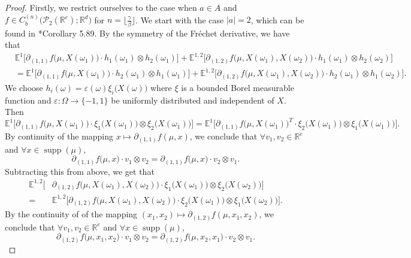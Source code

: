 \documentclass[a4paper,11pt,twoside]{article}
\numberwithin{equation}{section}
\theoremstyle{plain}
\newcommand{\bE}{\mathbb{E}}
\newcommand{\bR}{\mathbb{R}}
\newcommand{\cP}{\mathcal{P}}
\DeclareMathOperator{\supp}{supp}
\newcommand{\1}{\mathbbm{1}}
\begin{document}
	\begin{proof}
		Firstly, we restrict ourselves to the case when $a\in A$ and $f\in C_b^{(n)}\big( \cP_2(\bR^e); \bR^d\big)$ for $n = \big\lfloor\tfrac{\gamma}{\beta} \big\rfloor$. We start with the case $|a|=2$, which can be found in \cite{CarmonaDelarue2017book1}*{Corollary 5.89}. By the symmetry of the Fr\'echet derivative, we have that
		\begin{align*}
			&\bE^1\Big[ \partial_{(1,1)} f\Big( \mu, X(\omega_1) \Big) \cdot h_1(\omega_1) \otimes h_2(\omega_1) \Big] + \bE^{1,2}\Big[ \partial_{(1,2)} f\Big( \mu, X(\omega_1), X(\omega_2) \Big) \cdot h_1(\omega_1) \otimes h_2(\omega_2) \Big]
			\\
			&= \bE^1\Big[ \partial_{(1,1)} f\Big( \mu, X(\omega_1) \Big) \cdot h_2(\omega_1) \otimes h_1(\omega_1) \Big] + \bE^{1,2}\Big[ \partial_{(1,2)} f\Big( \mu, X(\omega_1), X(\omega_2) \Big) \cdot h_2(\omega_1) \otimes h_1(\omega_2) \Big]. 
		\end{align*}
		We choose $h_i(\omega) = \varepsilon(\omega) \xi_i \big( X(\omega) \big)$ where $\xi$ is a bounded Borel measurable function and $\varepsilon: \Omega \to \{-1, 1\}$ be uniformly distributed and independent of $X$. Then
		$$
		\bE^1\Big[ \partial_{(1,1)} f \Big(\mu, X(\omega_1)\Big) \cdot \xi_1\big( X(\omega_1) \big) \otimes \xi_2\big( X(\omega_1) \big) \Big] 
		=
		\bE^1\Big[ \partial_{(1,1)} f \Big(\mu, X(\omega_1)\Big)^T \cdot \xi_2\big( X(\omega_1)\big) \otimes \xi_1\big( X(\omega_1) \big) \Big] . 
		$$
		By continuity of the mapping $x\mapsto \partial_{(1,1)} f(\mu, x)$, we conclude that $\forall v_1, v_2\in \bR^e$ and $\forall x\in \supp(\mu)$, 
		\begin{equation}
			\label{eq:proposition:Schwartz-2.2}
			\partial_{(1,1)}  f\Big( \mu, x\Big) \cdot v_1 \otimes v_2 
			= 
			\partial_{(1,1)}  f\Big( \mu, x\Big) \cdot v_2 \otimes v_1. 
		\end{equation}
		Subtracting this from above, we get that
		\begin{align*}
			\bE^{1,2}\Big[& \partial_{(1,2)} f \Big(\mu, X(\omega_1), X(\omega_2) \Big) \cdot \xi_1\big( X(\omega_1) \big) \otimes \xi_2\big( X(\omega_2) \big) \Big] 
			\\
			=&
			\bE^{1,2}\Big[ \partial_{(1,2)} f \Big(\mu, X(\omega_1), X(\omega_2) \Big) \cdot \xi_2\big( X(\omega_1) \big) \otimes \xi_1\big( X(\omega_2) \big) \Big]. 
		\end{align*}
		By the continuity of of the mapping $(x_1, x_2) \mapsto \partial_{(1,2)} f(\mu, x_1, x_2)$, we conclude that $\forall v_1, v_2\in \bR^e$ and $\forall x\in \supp(\mu)$, 
		\begin{equation}
			\label{eq:proposition:Schwartz-2.1}
			\partial_{(1,2)}  f\Big( \mu, x_1, x_2 \Big) \cdot v_1 \otimes v_2 
			= 
			\partial_{(1,2)}  f\Big( \mu, x_2, x_1 \Big) \cdot v_2 \otimes v_1. 
		\end{equation}
		

\end{proof}
\end{document}
